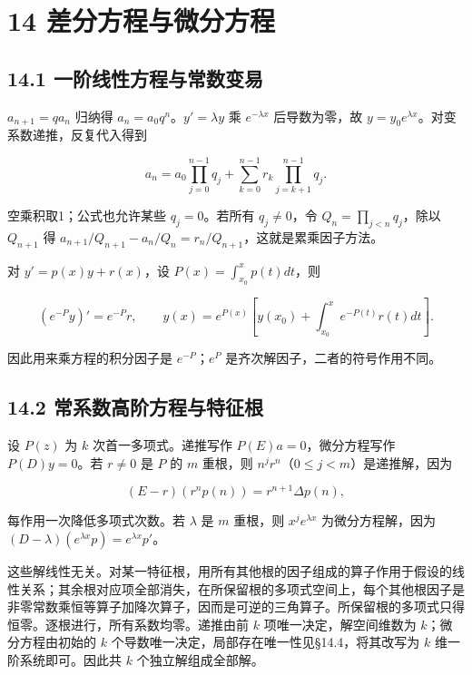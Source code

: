 \documentclass[11pt,a4paper]{article}
\begin{document}
\clearpage

\section{14
差分方程与微分方程}\label{ux5deeux5206ux65b9ux7a0bux4e0eux5faeux5206ux65b9ux7a0b}

\subsection{14.1
一阶线性方程与常数变易}\label{ux4e00ux9636ux7ebfux6027ux65b9ux7a0bux4e0eux5e38ux6570ux53d8ux6613}

\(a_{n+1}=qa_n\) 归纳得 \(a_n=a_0q^n\)。\(y'=\lambda y\) 乘
\(e^{-\lambda x}\) 后导数为零，故
\(y=y_0e^{\lambda x}\)。对变系数递推，反复代入得到

\[
a_n=a_0\prod_{j=0}^{n-1}q_j
+\sum_{k=0}^{n-1}r_k\prod_{j=k+1}^{n-1}q_j.\tag{14.1}
\]

空乘积取1；公式也允许某些 \(q_j=0\)。若所有 \(q_j\ne0\)，令
\(Q_n=\prod_{j<n}q_j\)，除以 \(Q_{n+1}\) 得
\(a_{n+1}/Q_{n+1}-a_n/Q_n=r_n/Q_{n+1}\)，这就是累乘因子方法。

对 \(y'=p(x)y+r(x)\)，设 \(P(x)=\int_{x_0}^xp(t)dt\)，则

\[
(e^{-P}y)'=e^{-P}r,\qquad
 y(x)=e^{P(x)}\left[y(x_0)+\int_{x_0}^xe^{-P(t)}r(t)dt\right].\tag{14.2}
\]

因此用来乘方程的积分因子是 \(e^{-P}\)；\(e^P\)
是齐次解因子，二者的符号作用不同。

\subsection{14.2
常系数高阶方程与特征根}\label{ux5e38ux7cfbux6570ux9ad8ux9636ux65b9ux7a0bux4e0eux7279ux5f81ux6839}

设 \(P(z)\) 为 \(k\) 次首一多项式。递推写作 \(P(E)a=0\)，微分方程写作
\(P(D)y=0\)。若 \(r\ne0\) 是 \(P\) 的 \(m\) 重根，则
\(n^jr^n\)（\(0\le j<m\)）是递推解，因为

\[
(E-r)(r^np(n))=r^{n+1}\Delta p(n),
\]

每作用一次降低多项式次数。若 \(\lambda\) 是 \(m\) 重根，则
\(x^je^{\lambda x}\) 为微分方程解，因为
\((D-\lambda)(e^{\lambda x}p)=e^{\lambda x}p'\)。

这些解线性无关。对某一特征根，用所有其他根的因子组成的算子作用于假设的线性关系；其余根对应项全部消失，在所保留根的多项式空间上，每个其他根因子是非零常数乘恒等算子加降次算子，因而是可逆的三角算子。所保留根的多项式只得恒零。逐根进行，所有系数均零。递推由前
\(k\) 项唯一决定，解空间维数为 \(k\)；微分方程由初始的 \(k\)
个导数唯一决定，局部存在唯一性见§14.4，将其改写为 \(k\)
维一阶系统即可。因此共 \(k\) 个独立解组成全部解。
\end{document}
